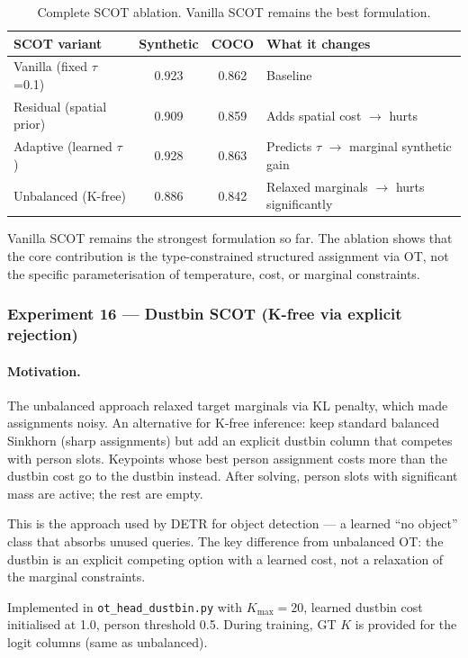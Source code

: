 \begin{table}[H]
\centering
\footnotesize
\begin{tabular}{lccl}
\toprule
SCOT variant & Synthetic & COCO & What it changes \\
\midrule
Vanilla (fixed $\tau$=0.1) & 0.923 & 0.862 & Baseline \\
Residual (spatial prior) & 0.909 & 0.859 & Adds spatial cost $\to$ hurts \\
Adaptive (learned $\tau$) & 0.928 & 0.863 & Predicts $\tau$ $\to$ marginal synthetic gain \\
Unbalanced (K-free) & 0.886 & 0.842 & Relaxed marginals $\to$ hurts significantly \\
\bottomrule
\end{tabular}
\caption{Complete SCOT ablation. Vanilla SCOT remains the best formulation.}
\end{table}

Vanilla SCOT remains the strongest formulation so far. The ablation shows that the core contribution is the type-constrained structured assignment via OT, not the specific parameterisation of temperature, cost, or marginal constraints.


\subsubsection{Experiment 16 --- Dustbin SCOT (K-free via explicit rejection)}

\paragraph{Motivation.}

The unbalanced approach relaxed target marginals via KL penalty, which made assignments noisy. An alternative for K-free inference: keep standard balanced Sinkhorn (sharp assignments) but add an explicit dustbin column that competes with person slots. Keypoints whose best person assignment costs more than the dustbin cost go to the dustbin instead. After solving, person slots with significant mass are active; the rest are empty.

This is the approach used by DETR for object detection --- a learned ``no object'' class that absorbs unused queries. The key difference from unbalanced OT: the dustbin is an explicit competing option with a learned cost, not a relaxation of the marginal constraints.

Implemented in \texttt{ot\_head\_dustbin.py} with $K_{\max} = 20$, learned dustbin cost initialised at 1.0, person threshold 0.5. During training, GT $K$ is provided for the logit columns (same as unbalanced).


